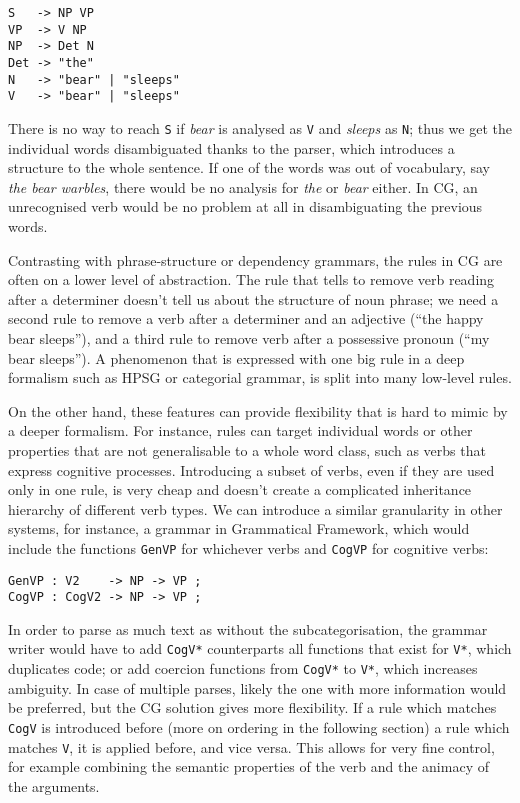 \begin{verbatim}
S   -> NP VP
VP  -> V NP
NP  -> Det N
Det -> "the"
N   -> "bear" | "sleeps"
V   -> "bear" | "sleeps"
\end{verbatim}

There is no way to reach \texttt{S} if \emph{bear} is analysed as
\texttt{V} and \emph{sleeps} as \texttt{N}; thus we get the individual
words disambiguated thanks to the parser, which introduces a structure
to the whole sentence. If one of the words was out of vocabulary, say
\emph{the bear warbles}, there would be no analysis for \emph{the} or
\emph{bear} either. In CG, an unrecognised verb would be no problem at
all in disambiguating the previous words.


Contrasting with phrase-structure or dependency grammars, the rules in
CG are often on a lower level of abstraction. 
The rule that tells to remove verb reading after a determiner
doesn't tell us about the structure of noun phrase; we need a second
rule to remove a verb after a determiner and an adjective (``the happy
bear sleeps''), and a third rule to remove verb after a possessive
pronoun (``my bear sleeps''). A phenomenon that is expressed with one
big rule in a deep formalism such as HPSG or categorial grammar, is
split into many low-level rules.

On the other hand, these features can provide
flexibility that is hard to mimic by a deeper formalism.
For instance, rules can target individual words
or other properties that are not generalisable to a whole word class,
such as verbs that express cognitive processes.
Introducing a subset of verbs, even if they are used only in one rule,
is very cheap and doesn't create a complicated inheritance hierarchy
of different verb types.
We can introduce a similar granularity in other systems, for instance,
a grammar in Grammatical Framework, which would include the functions
\texttt{GenVP} for whichever verbs and \texttt{CogVP} for cognitive verbs:


\begin{verbatim}
GenVP : V2    -> NP -> VP ;
CogVP : CogV2 -> NP -> VP ;
\end{verbatim}

In order to parse as much text as without the subcategorisation, the
grammar writer would have to add \texttt{CogV*} counterparts all
functions that exist for \texttt{V*}, which duplicates code; or add
coercion functions from  \texttt{CogV*} to \texttt{V*}, which increases ambiguity.
In case of multiple parses, likely the one with more information
would be preferred, but the CG solution gives more flexibility. If a
rule which matches \texttt{CogV} is introduced before (more on
ordering in the following section) a rule which matches \texttt{V}, it
is applied before, and vice versa. This allows for very fine control,
for example combining the semantic properties of the verb and the
animacy of the arguments.

